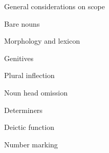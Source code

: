 \begin{listWWNumviileveli}
\item 
\setcounter{listWWNumviilevelii}{0}
\begin{listWWNumviilevelii}
\item 
\begin{styleListParagraph}
General considerations on scope 
\end{styleListParagraph}

\item 
\begin{styleListParagraph}
Bare nouns 
\end{styleListParagraph}


\setcounter{listWWNumviileveliii}{0}
\begin{listWWNumviileveliii}
\item 
\begin{styleListParagraph}
Morphology and lexicon
\end{styleListParagraph}

\item 
\begin{styleListParagraph}
Genitives 
\end{styleListParagraph}

\item 
\begin{styleListParagraph}
Plural inflection 
\end{styleListParagraph}

\item 
\begin{styleListParagraph}
Noun head omission
\end{styleListParagraph}

\end{listWWNumviileveliii}
\item 
\begin{styleListParagraph}
Determiners
\end{styleListParagraph}


\setcounter{listWWNumviileveliii}{0}
\begin{listWWNumviileveliii}
\item 
\begin{styleListParagraph}
Deictic function
\end{styleListParagraph}

\item 
\begin{styleListParagraph}
Number marking
\end{styleListParagraph}


\end{listWWNumviileveliii}
\end{listWWNumviilevelii}
\end{listWWNumviileveli}
